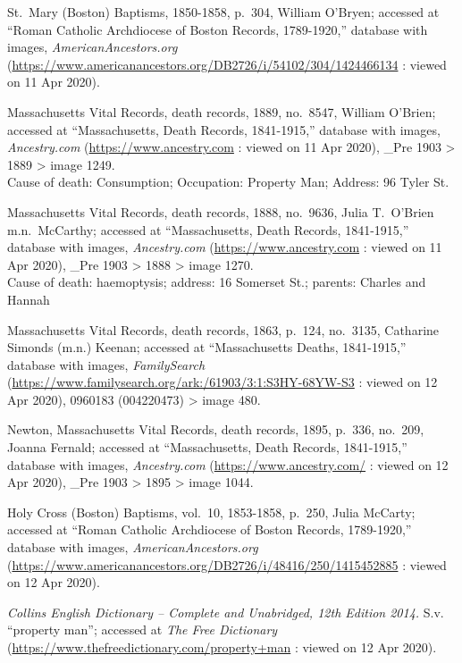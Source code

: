 \begin{thebibliography}{999}
	St.\ Mary (Boston) Baptisms, 1850-1858, p.\ 304, William O'Bryen; accessed at ``Roman Catholic Archdiocese of Boston Records, 1789-1920,'' database with images, \textit{AmericanAncestors.org} (\url{https://www.americanancestors.org/DB2726/i/54102/304/1424466134} : viewed on 11 Apr 2020).	
	
	Massachusetts Vital Records, death records, 1889, no.\ 8547, William O'Brien; accessed at ``Massachusetts, Death Records, 1841-1915,'' database with images, \textit{Ancestry.com} (\url{https://www.ancestry.com} : viewed on 11 Apr 2020), \_Pre 1903 > 1889 > image 1249.\\
	Cause of death: Consumption; Occupation: Property Man; Address: 96 Tyler St.
	
	Massachusetts Vital Records, death records, 1888, no.\ 9636, Julia T.\ O'Brien m.n.\ McCarthy; accessed at ``Massachusetts, Death Records, 1841-1915,'' database with images, \textit{Ancestry.com} (\url{https://www.ancestry.com} : viewed on 11 Apr 2020), \_Pre 1903 > 1888 > image 1270.\\
	Cause of death: haemoptysis; address: 16 Somerset St.; parents: Charles and Hannah
	
	Massachusetts Vital Records, death records, 1863, p.\ 124, no.\ 3135, Catharine Simonds (m.n.) Keenan; accessed at ``Massachusetts Deaths, 1841-1915,'' database with images, \textit{FamilySearch} (\url{https://www.familysearch.org/ark:/61903/3:1:S3HY-68YW-S3} : viewed on 12 Apr 2020), 0960183 (004220473) > image 480.
	
	Newton, Massachusetts Vital Records, death records, 1895, p.\ 336, no.\ 209, Joanna Fernald; accessed at ``Massachusetts, Death Records, 1841-1915,'' database with images, \textit{Ancestry.com} (\url{https://www.ancestry.com/} : viewed on 12 Apr 2020), \_Pre 1903 > 1895 > image 1044.
	
	Holy Cross (Boston) Baptisms, vol.\ 10, 1853-1858, p.\ 250, Julia McCarty; accessed at ``Roman Catholic Archdiocese of Boston Records, 1789-1920,'' database with images, \textit{AmericanAncestors.org} (\url{https://www.americanancestors.org/DB2726/i/48416/250/1415452885} : viewed on 12 Apr 2020).	
	
	\textit{Collins English Dictionary -- Complete and Unabridged, 12th Edition 2014.} S.v. ``property man''; accessed at \textit{The Free Dictionary} (\url{https://www.thefreedictionary.com/property+man} : viewed on 12 Apr 2020).
	

\end{thebibliography}
